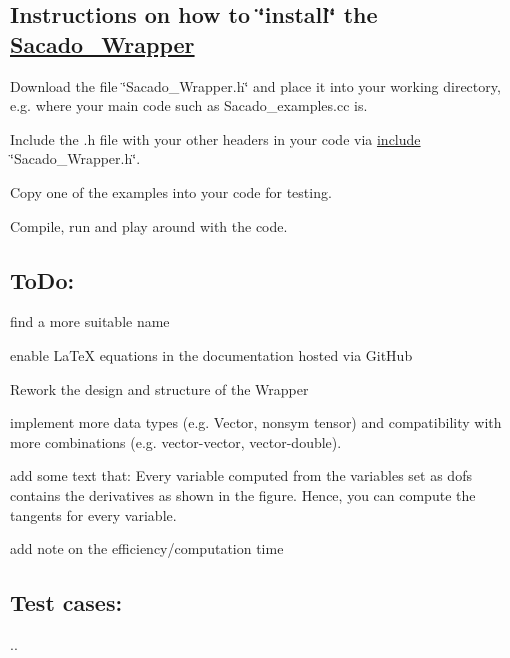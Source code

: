 \subsection*{Instructions on how to \char`\"{}install\char`\"{} the \hyperlink{namespaceSacado__Wrapper}{Sacado\+\_\+\+Wrapper}}


\begin{DoxyEnumerate}
\item Download the file \char`\"{}\+Sacado\+\_\+\+Wrapper.\+h\char`\"{} and place it into your working directory, e.\+g. where your main code such as Sacado\+\_\+examples.\+cc is.
\item Include the .h file with your other headers in your code via \textquotesingle{}\hyperlink{CMakeCache_8txt_a986ccfc90e04633694fe6cff5472be19}{include} \char`\"{}\+Sacado\+\_\+\+Wrapper.\+h\char`\"{}\textquotesingle{}.
\item Copy one of the examples into your code for testing.
\item Compile, run and play around with the code.
\end{DoxyEnumerate}

\subsection*{To\+Do\+:}


\begin{DoxyItemize}
\item find a more suitable name
\item enable La\+TeX equations in the documentation hosted via Git\+Hub
\item Rework the design and structure of the Wrapper
\item implement more data types (e.\+g. Vector, nonsym tensor) and compatibility with more combinations (e.\+g. vector-\/vector, vector-\/double).
\item add some text that\+: Every variable computed from the variables set as dofs contains the derivatives as shown in the figure. Hence, you can compute the tangents for every variable.
\item add note on the efficiency/computation time
\end{DoxyItemize}

\subsection*{Test cases\+:}


\begin{DoxyItemize}
\item .. 
\end{DoxyItemize}